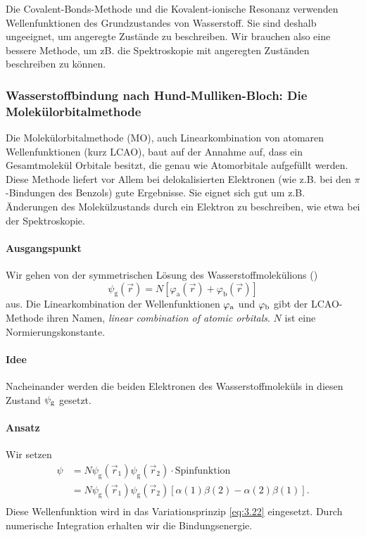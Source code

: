 \begin{verbal}
	Die Covalent-Bonds-Methode und die Kovalent-ionische Resonanz verwenden Wellenfunktionen des Grundzustandes von Wasserstoff.
	Sie sind deshalb ungeeignet, um angeregte Zustände zu beschreiben.
	Wir brauchen also eine bessere Methode, um zB. die Spektroskopie mit angeregten Zuständen beschreiben zu können.
\end{verbal}

\setcounter{section}{3}
\setcounter{subsection}{3}
\setcounter{subsubsection}{3}
\setcounter{equation}{58}
\setcounter{figure}{9}
 

\subsubsection{Wasserstoffbindung nach Hund-Mulliken-Bloch: Die Molekülorbitalmethode}
	Die Molekülorbitalmethode (MO), auch Linearkombination von atomaren Wellenfunktionen (kurz LCAO), baut auf der Annahme auf, dass ein Gesamtmolekül Orbitale besitzt, die genau wie Atomorbitale aufgefüllt werden. 
	Diese Methode liefert vor Allem bei delokalisierten Elektronen (wie z.B. bei den $ \pi$-Bindungen des Benzols) gute Ergebnisse. 
	Sie eignet sich gut um z.B. Änderungen des Molekülzustands durch ein Elektron zu beschreiben, wie etwa bei der Spektroskopie.
\paragraph{Ausgangspunkt} 
	Wir gehen von der symmetrischen Lösung des Wasserstoffmolekülions ()
	\begin{equation}
		\label{eq:3.59}
		\psi_{\mathrm{g}} \left( \Vec{r} \right) = N\left[ \varphi_\text{a}\left( \Vec{r} \right) + \varphi_\text{b} \left( \Vec{r} \right)  \right] 
	\end{equation}
	aus. Die Linearkombination der Wellenfunktionen $\varphi_\text a$ und $\varphi_\text b$ gibt der LCAO-Methode ihren Namen, \textit{linear combination of atomic orbitals}. 
	$N$ ist eine Normierungskonstante.
\paragraph{Idee} 
	Nacheinander werden die beiden Elektronen des Wasserstoffmoleküls in diesen Zustand $\psi_\text g$ gesetzt.
\paragraph{Ansatz} 
	Wir setzen
	\begin{equation}
		\label{eq:3.60}
		\begin{split}
			\psi &=  N \psi_{\mathrm{g}} \left( \Vec{r}_{1} \right) \psi_{\mathrm{g}} \left( \Vec{r}_{2}\right) \cdot \text{Spinfunktion}  \\
				&= N \psi_{\mathrm{g}} \left( \Vec{r}_{1} \right) \psi_{\mathrm{g}} \left( \Vec{r}_{2} \right) \left[ \alpha ( 1 ) \beta(2) - \alpha(2) \beta (1)  \right].  \\
		\end{split}
	\end{equation}
	Diese Wellenfunktion wird in das Variationsprinzip \eqref{eq:3.22} eingesetzt. 
	Durch numerische Integration erhalten wir die Bindungsenergie.

